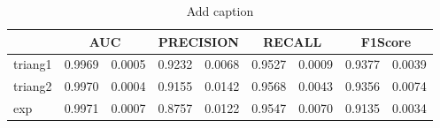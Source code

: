 \begin{table}[htbp]
  \centering
  \caption{Add caption}
    \begin{tabular}{|p{2.945em}|c|c|c|c|c|c|c|c|}
    \toprule
    \rowcolor[rgb]{ .718,  .871,  .91} \multicolumn{1}{|l|}{Policy} & \multicolumn{2}{c|}{AUC} & \multicolumn{2}{c|}{PRECISION} & \multicolumn{2}{c|}{RECALL} & \multicolumn{2}{c|}{F1Score} \\
    \midrule
    \rowcolor[rgb]{ .847,  .894,  .737} triang1 & 0.9969 & 0.0005 & 0.9232 & 0.0068 & 0.9527 & 0.0009 & 0.9377 & 0.0039 \\
    \midrule
    \rowcolor[rgb]{ .847,  .894,  .737} triang2 & 0.9970 & 0.0004 & 0.9155 & 0.0142 & 0.9568 & 0.0043 & 0.9356 & 0.0074 \\
    \midrule
    \rowcolor[rgb]{ .847,  .894,  .737} exp   & 0.9971 & 0.0007 & 0.8757 & 0.0122 & 0.9547 & 0.0070 & 0.9135 & 0.0034 \\
    \bottomrule
    \end{tabular}%
  \label{tab:addlabel}%
\end{table}%
